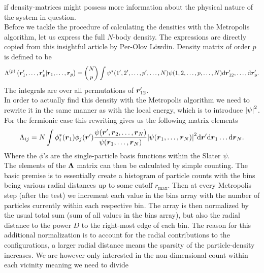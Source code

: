     if density-matrices might possess more information about the physical
    nature of the system in question. \\
    Before we tackle the procedure of calculating the densities with the
    Metropolis algorithm, let us express the full $N$-body density. The
    expressions are directly copied from this insightful article by Per-Olov
    L\"owdin\cite{onebodydens}. Density matrix of order $p$ is defined to be
        \begin{equation}
            \Lambda^{(p)}\left(\boldsymbol{{r}}'_1,\dots,\boldsymbol{{r}}'_p|\boldsymbol{{r}}_1,\dots,\boldsymbol{{r}}_p\right)
            = {N\choose p} \int \psi^{*}(1',2',\dots,p',\dots,N)
            \psi(1,2,\dots,p,\dots,N) \mathrm{d}\boldsymbol{{r}}_{12}',\dots,\mathrm{d}\boldsymbol{{r}}_{p}'.
        \end{equation}
    The integrals are over all permutations of $\boldsymbol{{r}}_{12}'$. \\
    In order to actually find this density with the Metropolis algorithm we
    need to rewrite it in the same manner as with the local energy, which is to
    introduce $\abs{\psi}^2$. For the fermionic case this rewriting gives us
    the following matrix elements
        \begin{equation}
            \Lambda_{ij} = N\int\phi^{*}_i(\boldsymbol{{r}}_1)\phi_j(\boldsymbol{{r}}')
            \frac{\psi(\boldsymbol{{r}}',\boldsymbol{{r}}_2,\dots,\boldsymbol{{r}}_N)}{\psi(\boldsymbol{{r}}_1,\dots,\boldsymbol{{r}}_N)}
            \abs{\psi(\boldsymbol{{r}}_1,\dots,\boldsymbol{{r}}_N)}^2
            \mathrm{d}\boldsymbol{{r}}'\mathrm{d}\boldsymbol{{r}}_1\dots\mathrm{d}\boldsymbol{{r}}_N.
        \end{equation}
    Where the $\phi$'s are the single-particle basis functions within the
    Slater $\psi$. \\
    The elements of the $\boldsymbol{{\Lambda}}$ matrix can then be calculated by
    simple counting. The basic premise is to essentially create a histogram of
    particle counts with the bins being various radial distances up to some
    cutoff $r_{\text{max}}$. Then at every Metropolis step (after the test) we
    increment each value in the bins array with the number of particles
    currently within each respective bin. The array is then normalized by the
    usual total sum (sum of all values in the bins array), but also the radial
    distance to the power $D$ to the right-most edge of each bin. The reason
    for this additional normalization is to account for the radial
    contributions to the configurations, a larger radial distance means the
    sparsity of the particle-density increases. We are however only interested
    in the non-dimensional count within each vicinity meaning we need to divide
